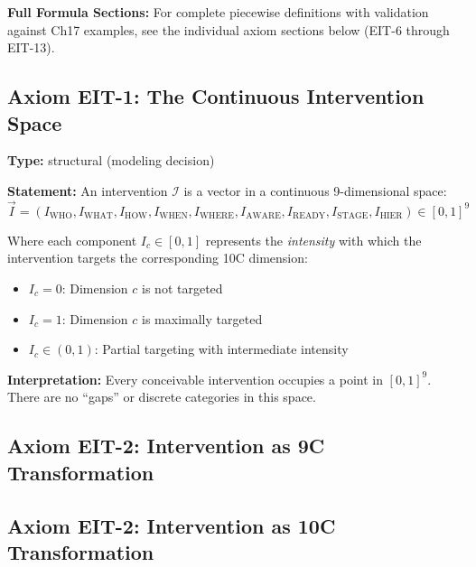 \textbf{Full Formula Sections:} For complete piecewise definitions with validation against Ch17 examples, see the individual axiom sections below (EIT-6 through EIT-13).

\subsection{Axiom EIT-1: The Continuous Intervention Space}
\label{sec:ie-axiom-1}

\begin{tcolorbox}[colback=blue!5!white, colframe=blue!75!black,
    title=\textbf{Axiom EIT-1: The Continuous Intervention Space}]

\textbf{Type:} structural (modeling decision)

\textbf{Statement:} An intervention $\mathcal{I}$ is a vector in a continuous 9-dimensional space:
\begin{equation}
\boxed{\vec{I} = (I_{\text{WHO}}, I_{\text{WHAT}}, I_{\text{HOW}}, I_{\text{WHEN}}, I_{\text{WHERE}}, I_{\text{AWARE}}, I_{\text{READY}}, I_{\text{STAGE}}, I_{\text{HIER}}) \in [0,1]^9}
\label{eq:ie-continuous-space}
\end{equation}

Where each component $I_c \in [0,1]$ represents the \textit{intensity} with which the intervention targets the corresponding 10C dimension:
\begin{itemize}[nosep]
    \item $I_c = 0$: Dimension $c$ is not targeted
    \item $I_c = 1$: Dimension $c$ is maximally targeted
    \item $I_c \in (0,1)$: Partial targeting with intermediate intensity
\end{itemize}

\textbf{Interpretation:} Every conceivable intervention occupies a point in $[0,1]^9$. There are no ``gaps'' or discrete categories in this space.
\end{tcolorbox}

\subsection{Axiom EIT-2: Intervention as 9C Transformation}
\label{sec:ie-axiom-2}
\subsection{Axiom EIT-2: Intervention as 10C Transformation}


